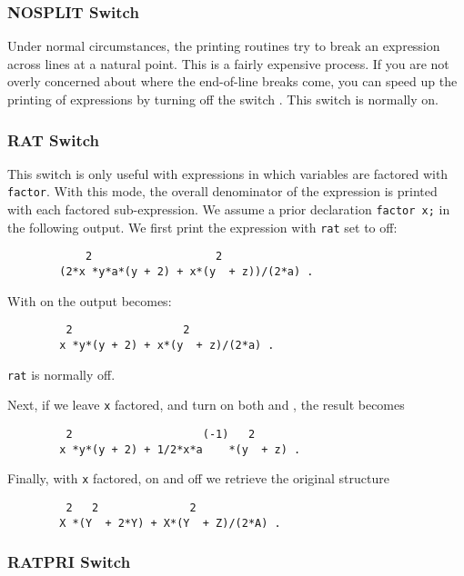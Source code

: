 \subsubsection{NOSPLIT Switch}
\hypertarget{switch:NOSPLIT}{}

Under normal circumstances, the printing routines try to break an expression
across lines at a natural point.  This is a fairly expensive process.  If
you are not overly concerned about where the end-of-line breaks come, you
can speed up the printing of expressions by turning off the switch
.  This switch is normally on.

\subsubsection{RAT Switch}
\hypertarget{switch:RAT}{}

This switch is only useful with expressions in which variables are
factored with \texttt{factor}. With this mode, the overall denominator of the
expression is printed with each factored sub-expression. We assume a prior
declaration \texttt{factor x;} in the following output. We first print the
expression with \texttt{rat} set to off:
\begin{verbatim}
            2                   2
        (2*x *y*a*(y + 2) + x*(y  + z))/(2*a) .
\end{verbatim}
With  on the output becomes:
\begin{verbatim}
         2                 2
        x *y*(y + 2) + x*(y  + z)/(2*a) .
\end{verbatim}
\texttt{rat} is normally off.

Next, if we leave \texttt{x} factored, and turn on both  and
, the result becomes
\begin{verbatim}
         2                    (-1)   2
        x *y*(y + 2) + 1/2*x*a    *(y  + z) .
\end{verbatim}
Finally, with \texttt{x} factored,  on and 
off we retrieve the original structure
\begin{verbatim}
         2   2              2
        X *(Y  + 2*Y) + X*(Y  + Z)/(2*A) .
\end{verbatim}

\subsubsection{RATPRI Switch}
\hypertarget{switch:RATPRI}{}


